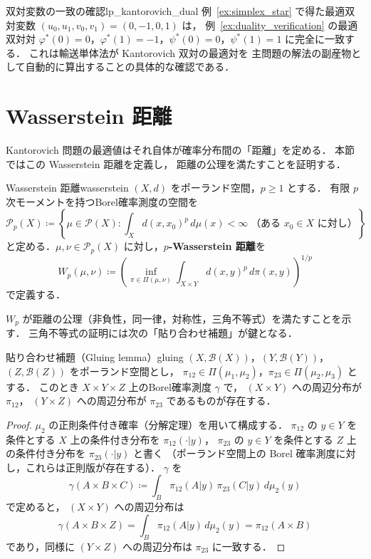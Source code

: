 \documentclass[uplatex, dvipdfmx]{jsarticle}
\begin{document}
\begin{remark}{双対変数の一致の確認}{lp_kantorovich_dual}
例~\ref{ex:simplex_star} で得た最適双対変数
$(u_0,u_1,v_0,v_1)=(0,-1,0,1)$ は，
例~\ref{ex:duality_verification} の最適双対対
$\varphi^*(0)=0$，$\varphi^*(1)=-1$，$\psi^*(0)=0$，$\psi^*(1)=1$
に完全に一致する．
これは輸送単体法が Kantorovich 双対の最適対を
主問題の解法の副産物として自動的に算出することの具体的な確認である．
\end{remark}

\section{Wasserstein 距離}

Kantorovich 問題の最適値はそれ自体が確率分布間の「距離」を定める．
本節ではこの Wasserstein 距離を定義し，
距離の公理を満たすことを証明する．

\begin{definition}{Wasserstein 距離}{wasserstein}
$(X,d)$ をポーランド空間，$p\ge 1$ とする．
有限 $p$ 次モーメントを持つBorel確率測度の空間を
\[
  \mathcal{P}_p(X) \coloneqq \left\{\mu\in\mathcal{P}(X) :
  \int_X d(x,x_0)^p\,d\mu(x)<\infty\;\text{（ある $x_0\in X$ に対し）}\right\}
\]
と定める．$\mu,\nu\in\mathcal{P}_p(X)$ に対し，\textbf{$p$-Wasserstein 距離}を
\[
  W_p(\mu,\nu)
  \coloneqq \left(\inf_{\pi\in\Pi(\mu,\nu)}
  \int_{X\times Y} d(x,y)^p\,d\pi(x,y)\right)^{1/p}
\]
で定義する．
\end{definition}

$W_p$ が距離の公理（非負性，同一律，対称性，三角不等式）を満たすことを示す．
三角不等式の証明には次の「貼り合わせ補題」が鍵となる．

\begin{proposition}{貼り合わせ補題（Gluing lemma）}{gluing}
$(X,\mathcal{B}(X))$，$(Y,\mathcal{B}(Y))$，$(Z,\mathcal{B}(Z))$
をポーランド空間とし，
$\pi_{12}\in\Pi(\mu_1,\mu_2)$，$\pi_{23}\in\Pi(\mu_2,\mu_3)$ とする．
このとき $X\times Y\times Z$ 上のBorel確率測度 $\gamma$ で，
$(X\times Y)$ への周辺分布が $\pi_{12}$，
$(Y\times Z)$ への周辺分布が $\pi_{23}$ であるものが存在する．
\end{proposition}

\begin{proof}
$\mu_2$ の正則条件付き確率（分解定理）を用いて構成する．
$\pi_{12}$ の $y\in Y$ を条件とする $X$ 上の条件付き分布を
$\pi_{12}(\cdot|y)$，
$\pi_{23}$ の $y\in Y$ を条件とする $Z$ 上の条件付き分布を
$\pi_{23}(\cdot|y)$ と書く
（ポーランド空間上の Borel 確率測度に対し，これらは正則版が存在する）．
$\gamma$ を
\[
  \gamma(A\times B\times C)
  \coloneqq \int_B \pi_{12}(A|y)\,\pi_{23}(C|y)\,d\mu_2(y)
\]
で定めると，
$(X\times Y)$ への周辺分布は
\[
  \gamma(A\times B\times Z)
  = \int_B \pi_{12}(A|y)\,d\mu_2(y) = \pi_{12}(A\times B)
\]
であり，同様に $(Y\times Z)$ への周辺分布は $\pi_{23}$ に一致する．
\end{proof}
\end{document}
